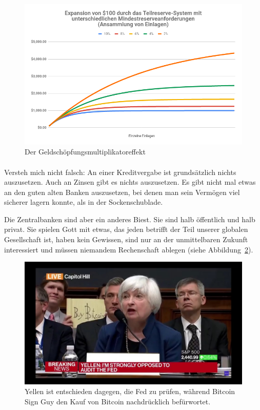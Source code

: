\begin{figure}
  \centering
  \includegraphics[width=\textwidth]{assets/images/money-multiplier-de.png}
  \caption{Der Geldschöpfungsmultiplikatoreffekt}
  \label{fig:money-multiplier}
\end{figure}

\paragraph{}
Versteh mich nicht falsch: An einer Kreditvergabe ist grundsätzlich nichts
auszusetzen. Auch an Zinsen gibt es nichts auszusetzen. Es gibt nicht mal etwas
an den guten alten Banken auszusetzen, bei denen man sein Vermögen viel sicherer
lagern konnte, als in der Sockenschublade.

Die Zentralbanken sind aber ein anderes Biest. Sie sind halb öffentlich und halb
privat. Sie spielen Gott mit etwas, das jeden betrifft der Teil unserer globalen
Gesellschaft ist, haben kein Gewissen, sind nur an der unmittelbaren Zukunft
interessiert und müssen niemandem Rechenschaft ablegen (siehe
Abbildung~\ref{fig:bsg}).

\begin{figure}
  \centering
  \includegraphics[width=\textwidth]{assets/images/bsg.jpg}
  \caption{Yellen ist entschieden dagegen, die Fed zu prüfen, während Bitcoin
  Sign Guy den Kauf von Bitcoin nachdrücklich befürwortet.}
  \label{fig:bsg}
\end{figure}

